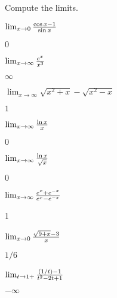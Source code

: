\begin{exercises}

\noindent Compute the limits.

\twocol

\begin{exercise} $\lim_{x\to 0} {\cos x -1\over \sin x}$
\begin{answer} $0$
\end{answer}\end{exercise}

\begin{exercise} $\lim_{x\to \infty} {e^x\over x^3}$
\begin{answer} $\infty$
\end{answer}\end{exercise}

\begin{exercise} $\lim_{x\to \infty} \sqrt{x^2+x}-\sqrt{x^2-x}$
\begin{answer} $1$
\end{answer}\end{exercise}

\begin{exercise} $\lim_{x\to \infty} {\ln x\over x}$
\begin{answer} $0$
\end{answer}\end{exercise}

\begin{exercise} $\lim_{x\to \infty} {\ln x\over \sqrt{x}}$
\begin{answer} $0$
\end{answer}\end{exercise}

\begin{exercise} $\lim_{x\to\infty} {e^x + e^{-x}\over e^x -e^{-x}}$
\begin{answer} 1
\end{answer}\end{exercise}

\begin{exercise} $\lim_{x\to0}{\sqrt{9+x}-3\over x}$
\begin{answer} $1/6$
\end{answer}\end{exercise}

\begin{exercise} $\lim_{t\to1+}{(1/t)-1\over t^2-2t+1}$
\begin{answer} $-\infty$
\end{answer}\end{exercise}


\end{exercises}
